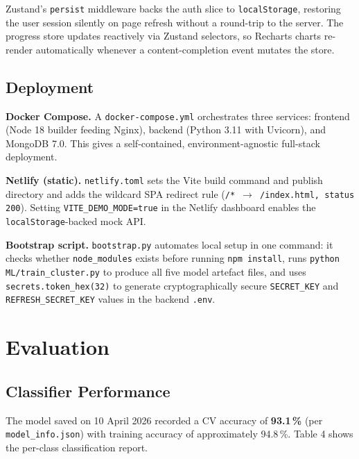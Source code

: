\documentclass[12pt,a4paper]{article}
\begin{document}
Zustand's \texttt{persist} middleware backs the auth slice to
\texttt{localStorage}, restoring the user session silently on page
refresh without a round-trip to the server. The progress store
updates reactively via Zustand selectors, so Recharts charts re-render
automatically whenever a content-completion event mutates the store.

\subsection{Deployment}

\noindent\textbf{Docker Compose.} A \texttt{docker-compose.yml}
orchestrates three services: frontend (Node 18 builder feeding Nginx),
backend (Python 3.11 with Uvicorn), and MongoDB 7.0. This gives a
self-contained, environment-agnostic full-stack deployment.

\noindent\textbf{Netlify (static).} \texttt{netlify.toml} sets the
Vite build command and publish directory and adds the wildcard SPA
redirect rule (\texttt{/* $\to$ /index.html, status 200}).
Setting \texttt{VITE\_DEMO\_MODE=true} in the Netlify dashboard
enables the \texttt{localStorage}-backed mock API.

\noindent\textbf{Bootstrap script.} \texttt{bootstrap.py} automates
local setup in one command: it checks whether \texttt{node\_modules}
exists before running \texttt{npm install}, runs
\texttt{python ML/train\_cluster.py} to produce all five model
artefact files, and uses \texttt{secrets.token\_hex(32)} to generate
cryptographically secure \texttt{SECRET\_KEY} and
\texttt{REFRESH\_SECRET\_KEY} values in the backend \texttt{.env}.

\section{Evaluation}

\subsection{Classifier Performance}

The model saved on 10 April 2026 recorded a CV accuracy of
\textbf{93.1\,\%} (per \texttt{model\_info.json}) with training
accuracy of approximately 94.8\,\%. Table 4 shows the per-class
classification report.
\end{document}
